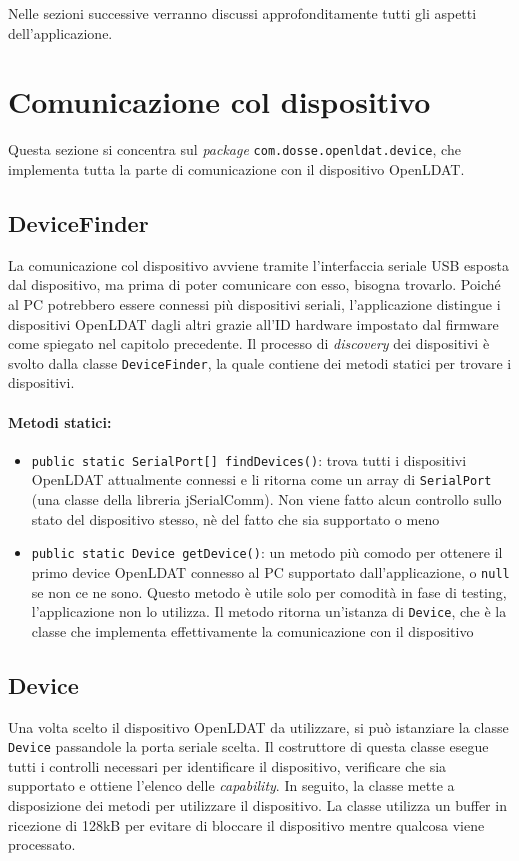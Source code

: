 Nelle sezioni successive verranno discussi approfonditamente tutti gli aspetti dell'applicazione.

\section{Comunicazione col dispositivo}
Questa sezione si concentra sul \textit{package} \texttt{com.dosse.openldat.device}, che implementa tutta la parte di comunicazione con il dispositivo OpenLDAT.

\subsection{DeviceFinder}
La comunicazione col dispositivo avviene tramite l'interfaccia seriale USB esposta dal dispositivo, ma prima di poter comunicare con esso, bisogna trovarlo. Poiché al PC potrebbero essere connessi più dispositivi seriali, l'applicazione distingue i dispositivi OpenLDAT dagli altri grazie all'ID hardware impostato dal firmware come spiegato nel capitolo precedente.
Il processo di \textit{discovery} dei dispositivi è svolto dalla classe \texttt{DeviceFinder}, la quale contiene dei metodi statici per trovare i dispositivi.

\paragraph{Metodi statici:}\begin{itemize}
	\item \texttt{public static SerialPort[] findDevices()}: trova tutti i dispositivi OpenLDAT attualmente connessi e li ritorna come un array di \texttt{SerialPort} (una classe della libreria jSerialComm). Non viene fatto alcun controllo sullo stato del dispositivo stesso, nè del fatto che sia supportato o meno
	\item \texttt{public static Device getDevice()}: un metodo più comodo per ottenere il primo device OpenLDAT connesso al PC supportato dall'applicazione, o \texttt{null} se non ce ne sono. Questo metodo è utile solo per comodità in fase di testing, l'applicazione non lo utilizza. Il metodo ritorna un'istanza di \texttt{Device}, che è la classe che implementa effettivamente la comunicazione con il dispositivo
\end{itemize}

\subsection{Device}
Una volta scelto il dispositivo OpenLDAT da utilizzare, si può istanziare la classe \texttt{Device} passandole la porta seriale scelta. Il costruttore di questa classe esegue tutti i controlli necessari per identificare il dispositivo, verificare che sia supportato e ottiene l'elenco delle \textit{capability}. In seguito, la classe mette a disposizione dei metodi per utilizzare il dispositivo. La classe utilizza un buffer in ricezione di 128kB per evitare di bloccare il dispositivo mentre qualcosa viene processato.


